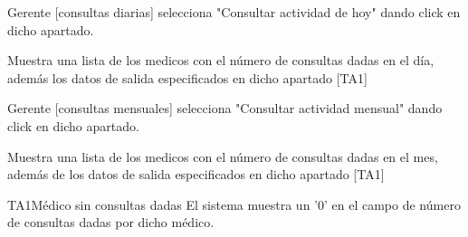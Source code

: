 \begin{UCtrayectoria}{Gerente  [consultas diarias]}
        \UCpaso[\UCactor] selecciona "Consultar actividad de hoy" dando click en dicho apartado.
        
        \UCpaso Muestra una lista de los medicos con el número de consultas dadas en el día, además los datos de salida especificados en dicho apartado [TA1]

\end{UCtrayectoria}

\begin{UCtrayectoria}{Gerente  [consultas mensuales]}
        \UCpaso[\UCactor] selecciona "Consultar actividad mensual" dando click en dicho apartado.
        
        \UCpaso Muestra una lista de los medicos con el número de consultas dadas en el mes, además de los datos de salida especificados en dicho apartado [TA1]

\end{UCtrayectoria}

\begin{UCtrayectoriaA}{TA1}{Médico sin consultas dadas}
    \UCpaso El sistema muestra un '0' en el campo de número de consultas dadas por dicho médico.
    
   \end{UCtrayectoriaA}
 
